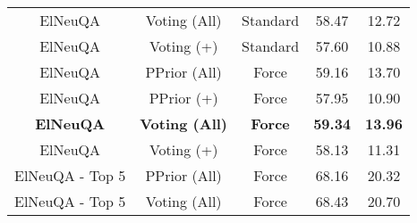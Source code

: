 \begin{table}[h!]
\begin{tabular}{|c|cc|cc|}
    ElNeuQA                          & Voting (All)                                                                                                    & Standard                                                                            & 58.47                                    & 12.72                  \\
    ElNeuQA                          & Voting (+)                                                                                                      & Standard                                                                            & 57.60                                     & 10.88                  \\ \hline
    ElNeuQA                          & PPrior (All)                                                                                                    & Force                                                                               & 59.16                                    & 13.70                   \\
    ElNeuQA                          & PPrior (+)                                                                                                      & Force                                                                               & 57.95                                    & 10.90                   \\
    \textbf{ElNeuQA}                 & \textbf{Voting (All)}                                                                                           & \textbf{Force}                                                                      & \textbf{59.34}                           & \textbf{13.96}         \\
    ElNeuQA                          & Voting (+)                                                                                                      & Force                                                                               & 58.13                                    & 11.31                  \\ \hline
    ElNeuQA - Top 5                  & PPrior (All)                                                                                                    & Force                                                                               & 68.16                                    & 20.32                  \\
    ElNeuQA - Top 5                  & Voting (All)                                                                                                    & Force                                                                               & 68.43                                    & 20.70                   \\ \hline

\end{tabular}
\end{table}

